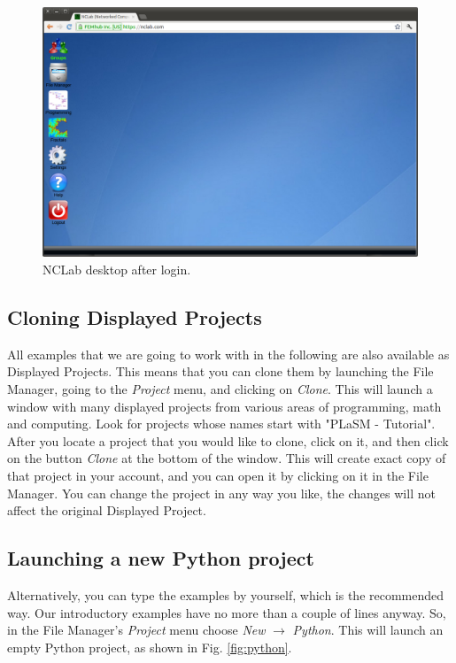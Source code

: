 \documentclass[article,A4,12pt]{llncs}
\begin{document}
\begin{figure}[!ht]
\begin{center}
\includegraphics[width=\textwidth]{img/desktop.png}
\end{center}
\caption{NCLab desktop after login.}
\label{fig:desktop}
\end{figure}

\subsection{Cloning Displayed Projects}

All examples that we are going to work with in the following are also available 
as Displayed Projects. This means that you can clone them by launching the File
Manager, going to the {\em Project} menu, and clicking on {\em Clone}. This will launch 
a window with many displayed projects from various areas of programming,
math and computing. Look for projects whose names start with "PLaSM - Tutorial".
After you locate a project that you would like to clone, click on it,
and then click on the button {\em Clone} at the bottom of the window. This will
create exact copy of that project in your account, and you can open it 
by clicking on it in the File Manager. You can change the project in any way 
you like, the changes will not affect the original Displayed Project. 


\subsection{Launching a new Python project}

Alternatively, you can type the examples by yourself, which is the 
recommended way. Our introductory examples have no more than 
a couple of lines anyway. So, in the File Manager's {\em Project} menu 
choose {\em New} $\rightarrow$ {\em Python}. This will launch an 
empty Python project, as shown in Fig. \ref{fig:python}.
\end{document}
